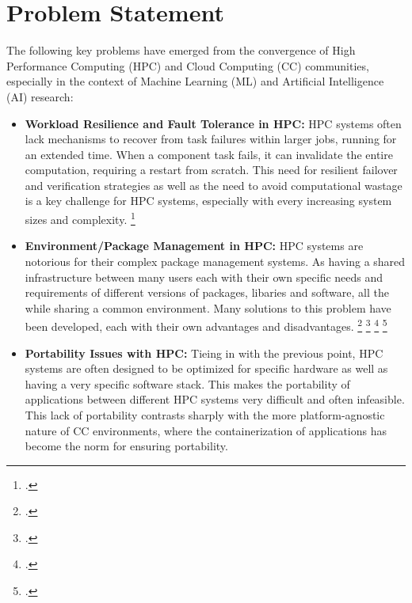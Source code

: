 \newpage

\section{Problem Statement}

The following key problems have emerged from the convergence of High Performance Computing (HPC) and Cloud Computing (CC) communities, especially in the context of Machine Learning (ML) and Artificial Intelligence (AI) research:

\begin{itemize}

    \item \textbf{Workload Resilience and Fault Tolerance in \ac{HPC}:} 
        \ac{HPC} systems often lack mechanisms to recover from task failures within
        larger jobs, running for an extended time.
        When a component task fails, it can invalidate the entire
        computation, requiring a restart from scratch.
        This need for resilient failover and verification strategies as well as the need to avoid
        computational wastage is a key challenge for \ac{HPC} systems, especially with every increasing system sizes and complexity.
        \footcite{egwutuohaSurveyFaultTolerance2013}

    \item \textbf{Environment/Package Management in \ac{HPC}:} 
        \ac{HPC} systems are notorious for their complex package management systems.
        As having a shared infrastructure between many users each with their own specific needs and requirements of different versions of packages, libaries and software,
        all the while sharing a common environment.
        Many solutions to this problem have been developed, each with their own advantages and disadvantages.
        \footcite{duboisWhyJohnnyCan2003} \footcite{bzeznikNixHPCPackage2017} \footcite{gamblinSpackPackageManager2015} \footcite{hosteEasyBuildBuildingSoftware2012}

    \item \textbf{Portability Issues with \ac{HPC}:}
        Tieing in with the previous point, \ac{HPC} systems are often designed to be optimized for specific hardware as well as having a very specific software stack.
        This makes the portability of applications between different \ac{HPC} systems very difficult and often infeasible.
        This lack of portability contrasts sharply with the more platform-agnostic nature of \ac{CC} environments, where the containerization of applications has become the norm for ensuring portability.


\end{itemize}
